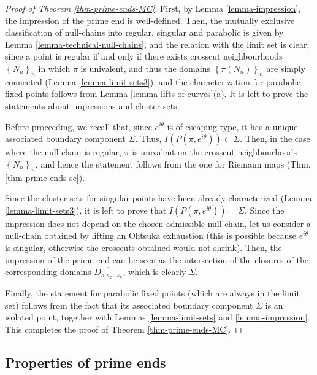 \documentclass[11pt,a4paper,reqno]{amsart}
\theoremstyle{plain}
\theoremstyle{definition}
\theoremstyle{plain}
\begin{document}
\begin{proof}[Proof of Theorem \ref{thm-prime-ends-MC}]
First, by Lemma \ref{lemma-impression}, the impression of the prime end is well-defined. Then, the mutually exclusive classification of null-chains into regular, singular and parabolic is given by Lemma \ref{lemma-technical-null-chains}, and the relation with the limit set is clear, since a  point is regular if and only if there exists crosscut neighbourhoods $ \left\lbrace N_n\right\rbrace _n $ in which $ \pi  $ is univalent, and thus the domains $ \left\lbrace \pi(N_n)\right\rbrace _n $ are simply connected (Lemma \ref{lemma-limit-sets3}), and the characterization for parabolic fixed points follows from Lemma \ref{lemma-lifts-of-curves}(a). It is left to prove the statements about impressions and cluster sets.

Before proceeding, we recall that, since $ e^{i\theta} $ is of escaping type, it has a unique associated boundary component $ \Sigma $. Thus, $ I (P(\pi, e^{i\theta}))\subset \Sigma $. Then, in the case where the null-chain is regular, $ \pi $ is univalent on the crosscut neighbourhoods $ \left\lbrace N_n\right\rbrace _n $, and hence the statement follows from the one for Riemann maps (Thm. \ref{thm-prime-ends-sc}). 

Since the cluster sets for singular points have been already characterized (Lemma \ref{lemma-limit-sets3}), it is left to prove that  $ I (P(\pi, e^{i\theta}))=\Sigma $. Since the impression does not depend on the chosen admissible null-chain, let us consider a null-chain obtained by lifting an Ohtsuka exhaustion (this is possible because $ e^{i\theta} $ is singular, otherwise the crosscuts obtained would not shrink). Then, the impression of the prime end can be seen as the intersection of the closures of the corresponding domains $ \overline{D_{s_1s_2\dots s_n}} $, which is clearly $ \Sigma $.

Finally, the statement for parabolic fixed points (which are always in the limit set) follows from the fact that its associated boundary component $ \Sigma $ is an isolated point, together with
Lemmas \ref{lemma-limit-sets} and \ref{lemma-impression}. This completes the proof of Theorem \ref{thm-prime-ends-MC}.
\end{proof}

\subsection*{Properties of prime ends}
\end{document}
